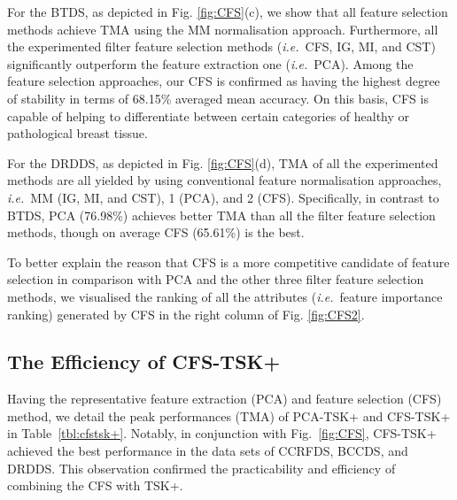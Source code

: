 \documentclass{article}
\newcommand{\zzie}{\emph{i.e.}~}
\newcommand*{\1}{\textcolor{magenta}}
\begin{document}
	For the BTDS, as depicted in Fig. \ref{fig:CFS}(c), we show that all feature selection methods achieve TMA using the MM normalisation approach. Furthermore, all the experimented filter feature selection methods (\zzie CFS, IG, MI, and CST) significantly outperform the feature extraction one (\zzie PCA). Among the feature selection approaches, our CFS is confirmed as having the highest degree of stability in terms of 68.15\% averaged mean accuracy. On this basis, CFS is capable of helping to differentiate between certain categories of healthy or pathological breast tissue.
	




	For the DRDDS, as depicted in Fig. \ref{fig:CFS}(d), TMA of all the experimented methods are all yielded by using conventional feature normalisation approaches, \zzie MM (IG, MI, and CST), 1 (PCA), and 2 (CFS). Specifically, in contrast to BTDS, PCA (76.98\%) achieves better TMA than all the filter feature selection methods, though on average CFS (65.61\%) is the best.
	
	




	To better explain the reason that CFS is a more competitive candidate of feature selection in comparison with PCA and the other three filter feature selection methods, we visualised the ranking of all the attributes (\zzie feature importance ranking) generated by CFS in the right column of Fig. \ref{fig:CFS2}. 
	








	














	\subsection{The Efficiency of CFS-TSK+}
	Having the representative feature extraction (PCA) and feature selection (CFS) method, we detail the peak performances (TMA) of PCA-TSK+ and CFS-TSK+ in Table~\ref{tbl:cfstsk+}. Notably, in conjunction with Fig.~\ref{fig:CFS}, CFS-TSK+ achieved the best performance in the data sets of CCRFDS, BCCDS, and DRDDS. This observation confirmed the practicability and efficiency of combining the CFS with TSK+. 
	
\end{document}
